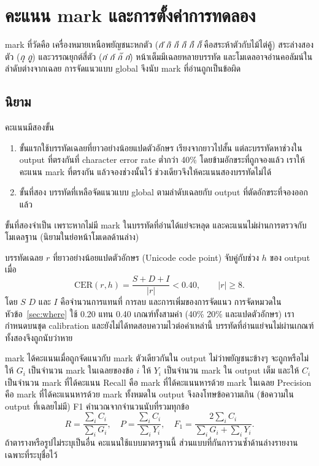 \section{คะแนน mark และการตั้งค่าการทดลอง}\label{sec:metric}\label{sec:setup}
mark ที่วัดคือ เครื่องหมายเหนือพยัญชนะหกตัว (\textit{กั กิ กี กึ กื ก็} คือสระห้าตัวกับไม้ไต่คู้) สระล่างสองตัว (\textit{กุ กู}) และวรรณยุกต์สี่ตัว (\textit{ก่ ก้ ก๊ ก๋}) หน้าเต็มมีเฉลยหลายบรรทัด และโมเดลอาจอ่านคอลัมน์ในลำดับต่างจากเฉลย การจัดแนวแบบ global จึงนับ mark ที่อ่านถูกเป็นข้อผิด

\subsection{นิยาม}
คะแนนมีสองขั้น
\begin{enumerate}
\item ขั้นแรกใช้บรรทัดเฉลยที่ยาวอย่างน้อยแปดตัวอักษร เรียงจากยาวไปสั้น แต่ละบรรทัดหาช่วงใน output ที่ตรงกันที่ character error rate ต่ำกว่า 40\% โดยข้ามอักขระที่ถูกจองแล้ว เราให้คะแนน mark ที่ตรงกัน แล้วจองช่วงนั้นไว้ ช่วงเดียวจึงให้คะแนนสองบรรทัดไม่ได้
\item ขั้นที่สอง บรรทัดที่เหลือจัดแนวแบบ global ตามลำดับเฉลยกับ output ที่ตัดอักขระที่จองออกแล้ว
\end{enumerate}
ขั้นที่สองจำเป็น เพราะหากไม่มี mark ในบรรทัดที่อ่านได้แย่จะหลุด และคะแนนไม่ผ่านการตรวจกับโมเดลฐาน (นิยามในย่อหน้าโมเดลด้านล่าง)

บรรทัดเฉลย $r$ ที่ยาวอย่างน้อยแปดตัวอักษร (Unicode code point) จับคู่กับช่วง $h$ ของ output เมื่อ
\begin{equation}
\mathrm{CER}(r,h)=\frac{S+D+I}{|r|}<0.40,\qquad |r|\ge 8.
\end{equation}
โดย $S$ $D$ และ $I$ คือจำนวนการแทนที่ การลบ และการเพิ่มของการจัดแนว การจัดหมวดในหัวข้อ~\ref{sec:where} ใช้ 0.20 แทน 0.40 เกณฑ์ทั้งสามค่า (40\% 20\% และแปดตัวอักษร) เรากำหนดบนชุด calibration และยังไม่ได้ทดสอบความไวต่อค่าเหล่านี้ บรรทัดที่อ่านแย่จนไม่ผ่านเกณฑ์ทั้งสองจึงถูกนับว่าหาย

mark ได้คะแนนเมื่อถูกจัดแนวกับ mark ตัวเดียวกันใน output ไม่ว่าพยัญชนะข้างๆ จะถูกหรือไม่ ให้ $G_i$ เป็นจำนวน mark ในเฉลยของข้อ $i$ ให้ $Y_i$ เป็นจำนวน mark ใน output เต็ม และให้ $C_i$ เป็นจำนวน mark ที่ได้คะแนน Recall คือ mark ที่ได้คะแนนหารด้วย mark ในเฉลย Precision คือ mark ที่ได้คะแนนหารด้วย mark ทั้งหมดใน output จึงลงโทษข้อความเกิน (ข้อความใน output ที่เฉลยไม่มี) F1 คำนวณจากจำนวนนับที่รวมทุกข้อ
\begin{equation}
R=\frac{\sum_i C_i}{\sum_i G_i},\quad
P=\frac{\sum_i C_i}{\sum_i Y_i},\quad
F_1=\frac{2\sum_i C_i}{\sum_i G_i+\sum_i Y_i}.
\end{equation}
ถ้าตารางหรือรูปไม่ระบุเป็นอื่น คะแนนใช้แบบมาตรฐานนี้ ส่วนแบบที่กันการวนซ้ำด้านล่างรายงานเฉพาะที่ระบุชื่อไว้

